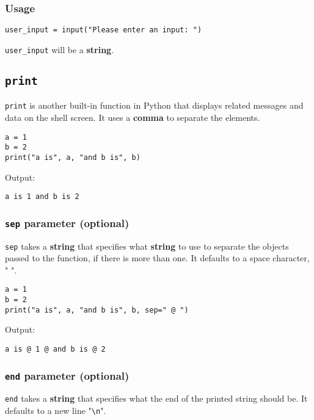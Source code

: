 \documentclass[11pt]{article}
\begin{document}
\subsubsection{Usage}
\label{sec:org7173242}
\begin{verbatim}
user_input = input("Please enter an input: ")
\end{verbatim}

 \noindent \texttt{user\_input} will be a \textbf{string}.

 \newpage
\subsection{\texttt{print}}
\label{sec:orgbc9d276}
\texttt{print} is another built-in function in Python that displays related messages and data on the shell screen. It uses a \textbf{comma} to separate the elements.

\begin{verbatim}
a = 1
b = 2
print("a is", a, "and b is", b)
\end{verbatim}

 \noindent Output:

\label{org9a59755}
\begin{verbatim}
a is 1 and b is 2
\end{verbatim}
\subsubsection{\texttt{sep} parameter (optional)}
\label{sec:org68274cd}
\texttt{sep} takes a \textbf{string} that specifies what \textbf{string} to use to separate the objects passed to the function, if there is more than one. It defaults to a space character, " ".

\begin{verbatim}
a = 1
b = 2
print("a is", a, "and b is", b, sep=" @ ")
\end{verbatim}

 \noindent Output:

\label{org649b43c}
\begin{verbatim}
a is @ 1 @ and b is @ 2
\end{verbatim}
\subsubsection{\texttt{end} parameter (optional)}
\label{sec:org70fa539}
\texttt{end} takes a \textbf{string} that specifies what the end of the printed string should be. It defaults to a new line "\texttt{\textbackslash{}n}".
\end{document}
